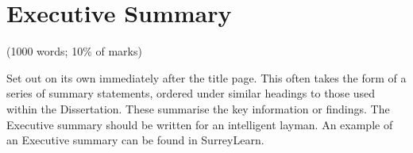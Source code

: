 
\chapter*{Executive Summary}\label{ch:executive summary}
(1000 words; 10\% of marks)

Set out on its own immediately after the title page.
This often takes the form of a series of summary statements, ordered under similar headings to those used within the Dissertation.
These summarise the key information or findings.
The Executive summary should be written for an intelligent layman.
An example of an Executive summary can be found in SurreyLearn.

\lipsum[1-3]

\newpage